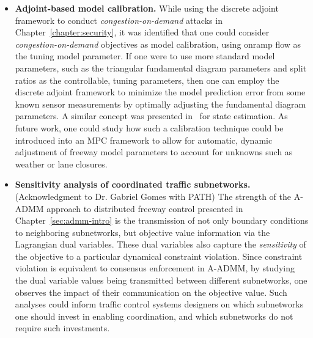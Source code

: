 \begin{itemize}
	\item \textbf{Adjoint-based model calibration.} While using the discrete adjoint framework to conduct \emph{congestion-on-demand} attacks in Chapter~\ref{chapter:security}, it was identified that one could consider \emph{congestion-on-demand} objectives as model calibration, using onramp flow as the tuning model parameter. If one were to use more standard model parameters, such as the triangular fundamental diagram parameters and split ratios as the controllable, tuning parameters, then one can employ the discrete adjoint framework to minimize the model prediction error from some known sensor measurements by optimally adjusting the fundamental diagram parameters. A similar concept was presented in~\cite{Jacquet2005} for state estimation. As future work, one could study how such a calibration technique could be introduced into an MPC framework to allow for automatic, dynamic adjustment of freeway model parameters to account for unknowns such as weather or lane closures.
	\item \textbf{Sensitivity analysis of coordinated traffic subnetworks.} (Acknowledgment to Dr. Gabriel Gomes with PATH) The strength of the A-ADMM approach to distributed freeway control presented in Chapter~\ref{sec:admm-intro} is the transmission of not only boundary conditions to neighboring subnetworks, but objective value information via the Lagrangian dual variables. These dual variables also capture the \emph{sensitivity} of the objective to a particular dynamical constraint violation. Since constraint violation is equivalent to consensus enforcement in A-ADMM, by studying the dual variable values being transmitted between different subnetworks, one observes the impact of their communication on the objective value. Such analyses could inform traffic control systems designers on which subnetworks one should invest in enabling coordination, and which subnetworks do not require such investments.
\end{itemize}
